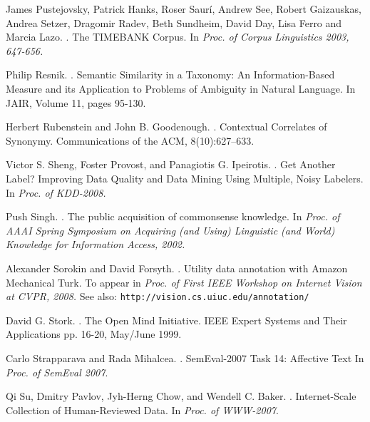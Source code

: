 \documentclass[11pt]{article}
\begin{document}
\begin{thebibliography}{}
James Pustejovsky, Patrick Hanks, Roser Saurí, Andrew See, Robert Gaizauskas, Andrea Setzer, Dragomir Radev, Beth Sundheim, David Day, Lisa Ferro and Marcia Lazo.
.
\newblock The TIMEBANK Corpus. 
\newblock In \textit{Proc. of Corpus Linguistics 2003, 647-656.}

Philip Resnik. 
.
\newblock Semantic Similarity in a Taxonomy: An Information-Based Measure and its Application to Problems of Ambiguity in Natural Language.
\newblock In JAIR, Volume 11, pages 95-130.

Herbert Rubenstein and John B. Goodenough.
.
\newblock Contextual Correlates of Synonymy.
\newblock Communications of the ACM, 8(10):627--633.

Victor S. Sheng, Foster Provost, and Panagiotis G. Ipeirotis.
.
\newblock Get Another Label? Improving Data Quality and Data Mining Using Multiple, Noisy Labelers.
\newblock In \textit{Proc. of KDD-2008.}

Push Singh.
. 
\newblock The public acquisition of commonsense knowledge.
\newblock In \textit{Proc. of AAAI Spring Symposium on Acquiring (and Using) Linguistic (and World) Knowledge for Information Access, 2002.}

Alexander Sorokin and David Forsyth.
.
\newblock Utility data annotation with Amazon Mechanical Turk.
\newblock To appear in \textit{Proc. of First IEEE Workshop on Internet Vision at CVPR, 2008.}
\newblock See also: \texttt{\scriptsize{http://vision.cs.uiuc.edu/annotation/}}

David G. Stork.
. 
\newblock The Open Mind Initiative.
\newblock IEEE Expert Systems and Their Applications pp. 16-20, May/June 1999.

Carlo Strapparava and Rada Mihalcea.
.
\newblock SemEval-2007 Task 14: Affective Text
\newblock In \textit{Proc. of SemEval 2007}.

Qi Su, Dmitry Pavlov, Jyh-Herng Chow, and Wendell C. Baker.
.
\newblock Internet-Scale Collection of Human-Reviewed Data. 
\newblock In \textit{Proc. of WWW-2007}.


\end{thebibliography}
\end{document}
